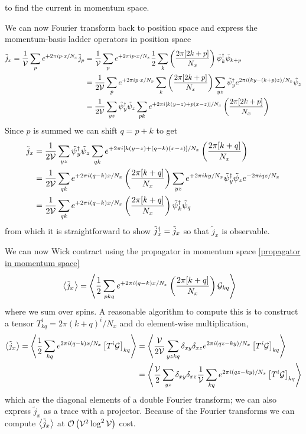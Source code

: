 to find the current in momentum space.

We can now Fourier transform back to position space and express the momentum-basis ladder operators in position space
\begin{align}
	\tilde{j}_x
	=
	\frac{1}{\mathcal{V}} \sum_p e^{+2\pi i p \cdot x / N_x} \tilde{j}_p 
	&=
	\frac{1}{\mathcal{V}} \sum_p e^{+2\pi i p \cdot x / N_x} 
	\frac{1}{2} \sum_k \left(\frac{2\pi [ 2k+p ]}{N_x}\right) \tilde{\psi}{}^{\dagger}_{k} \tilde{\psi}_{k+p}
	\nonumber\\
	&=
	\frac{1}{2\mathcal{V}} \sum_p e^{+2\pi i p \cdot x / N_x} 
	\sum_k \left(\frac{2\pi [ 2k+p ]}{N_x}\right) \sum_{yz} \tilde{\psi}{}^{\dagger}_{y} e^{2\pi i (ky - (k+p)z) / N_x} \tilde{\psi}_{z}
	\nonumber\\
	&=
	\frac{1}{2\mathcal{V}}
	\sum_{yz} \tilde{\psi}{}^{\dagger}_{y}  \tilde{\psi}_{z}
	\sum_{pk} e^{+2\pi i [ k (y-z) + p  (x-z) ]  / N_x} \left(\frac{2\pi [ 2k+p ]}{N_x}\right)
\end{align}
Since $p$ is summed we can shift $q=p+k$ to get
\begin{align}
	\tilde{j}_x
	&=
	\frac{1}{2\mathcal{V}}
	\sum_{yz} \tilde{\psi}{}^{\dagger}_{y}  \tilde{\psi}_{z}
	\sum_{qk} e^{+2\pi i [ k (y-z) + (q-k)  (x-z) ]  / N_x} \left(\frac{2\pi [ k+q ]}{N_x}\right)
	\nonumber\\
	&=
	\frac{1}{2\mathcal{V}}
	\sum_{qk} e^{+2\pi i (q-k) x / N_x} \left(\frac{2\pi [ k+q ]}{N_x}\right)
	\sum_{yz} e^{+2\pi i ky / N_x} \tilde{\psi}{}^{\dagger}_{y} \tilde{\psi}_{z} e^{-2\pi i q z / N_x}
	\\
	&=
	\frac{1}{2\mathcal{V}}
	\sum_{qk} e^{+2\pi i (q-k) x / N_x} \left(\frac{2\pi [ k+q ]}{N_x}\right)
	\tilde{\psi}{}^{\dagger}_{k} \tilde{\psi}_{q}
	\label{eq:current hermitian}
\end{align}
from which it is straightforward to show $\tilde{j}{}^{\dagger}_x = \tilde{j}_x$ so that $\tilde{j}_x$ is observable.

We can now Wick contract using the propagator in momentum space \eqref{propagator in momentum space}
\begin{align}
	\left\langle \tilde{j}_x \right\rangle
	&=
	\left\langle 
		\frac{1}{2} \sum_{pkq} e^{+2\pi i (q-k)x / N_x} \left(\frac{2\pi [ k+q ]}{N_x}\right)
		\mathcal{G}_{kq}
		 \right\rangle
\end{align}
where we sum over spins.
A reasonable algorithm to compute this is to construct a tensor $T_{kq}^i = 2\pi(k+q)^i/N_x$ and do element-wise multiplication,
\begin{align}
	\left\langle \tilde{j}_x \right\rangle
	=
	\left\langle 
		\frac{1}{2} \sum_{kq} e^{2\pi i(q-k) x / N_x} \left[ T^i \mathcal{G}\right]_{kq}
	 \right\rangle
	&=
	\left\langle 
		\frac{\mathcal{V}}{2\mathcal{V}} \sum_{yzkq} \delta_{xy}\delta_{xz} e^{2\pi i(qz-ky) / N_x} \left[ T^i \mathcal{G}\right]_{kq}
	 \right\rangle
	\nonumber\\
	&=
	\left\langle 
		\frac{\mathcal{V}}{2} \sum_{yz} \delta_{xy} \delta_{xz} \frac{1}{\mathcal{V}}\sum_{kq} e^{2\pi i(qz-ky) / N_x} \left[ T^i \mathcal{G}\right]_{kq}
	 \right\rangle
\end{align}
which are the diagonal elements of a double Fourier transform; we can also express $\tilde{j}_x$ as a trace with a projector.
Because of the Fourier transforms we can compute $\left\langle \tilde{j}_x \right\rangle$ at $\mathcal{O}\left(\mathcal{V}^2 \log^2 \mathcal{V}\right)$ cost.

